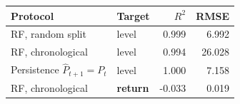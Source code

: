 \begin{tabular}{@{}llrr@{}}
\toprule
Protocol & Target & $R^2$ & RMSE \\
\midrule
RF, random split & level & 0.999 & 6.992 \\
RF, chronological & level & 0.994 & 26.028 \\
Persistence $\hat P_{t+1}{=}P_t$ & level & 1.000 & 7.158 \\
RF, chronological & \textbf{return} & -0.033 & 0.019 \\
\bottomrule
\end{tabular}
